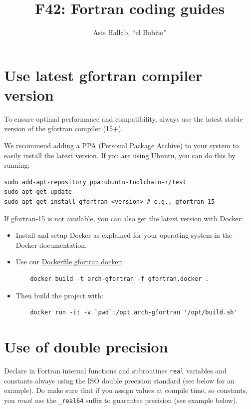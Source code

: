 \documentclass{article}
\title{F42: Fortran coding guides}
\author{Asis Hallab, ``el Bobito''}
\begin{document}
\maketitle

\tableofcontents
\vspace{1cm}

\newpage
\section{Use latest gfortran compiler version}

To ensure optimal performance and compatibility, always use the latest stable version of the gfortran compiler (15+). 

\noindent We recommend adding a PPA (Personal Package Archive) to your system to easily install the latest version. If you are using Ubuntu, you can do this by running:
\begin{verbatim}
sudo add-apt-repository ppa:ubuntu-toolchain-r/test
sudo apt-get update
sudo apt-get install gfortran-<version> # e.g., gfortran-15 
\end{verbatim}

\noindent If gfortran-15 is not available, you can also get the latest version with Docker: 
{\begin{itemize}
  \item Install and setup Docker as explained for your operating system in the Docker documentation.
  \item Use our \href{https://gitlab.rlp.net/a.hallab/tensor-omics/-/blob/main/gfortran.docker?ref_type=heads}{Dockerfile gfortran.docker}: 
  \begin{verbatim}
    docker build -t arch-gfortran -f gfortran.docker . 
  \end{verbatim}
  \item Then build the project with:
  \begin{verbatim}
    docker run -it -v `pwd`:/opt arch-gfortran '/opt/build.sh'
  \end{verbatim}
\end{itemize}}

\section{Use of double precision}

Declare in Fortran internal functions and subroutines \texttt{real} variables and constants always using the ISO double precision standard (see below for an example). Do make sure that if you assign values at compile time, so constants, you \emph{must use} the \texttt{\_real64} suffix to guarantee precision (see example below).
\end{document}
